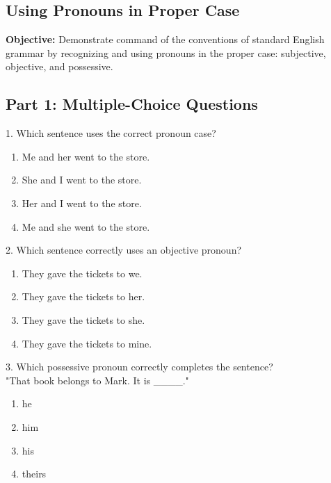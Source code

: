 \documentclass[12pt]{article}
\begin{document}
\subsection*{Using Pronouns in Proper Case}
\onehalfspacing

\begin{tcolorbox}[colframe=black!40, colback=gray!0, title=Learning Objective]
\textbf{Objective:} Demonstrate command of the conventions of standard English grammar by recognizing and using pronouns in the proper case: subjective, objective, and possessive.
\end{tcolorbox}

\subsection*{Part 1: Multiple-Choice Questions}

1. Which sentence uses the correct pronoun case?  
\begin{enumerate}[label=\Alph*.]
    \item Me and her went to the store.  
    \item She and I went to the store.  
    \item Her and I went to the store.  
    \item Me and she went to the store.  
\end{enumerate}

\vspace{1cm}

2. Which sentence correctly uses an objective pronoun?  
\begin{enumerate}[label=\Alph*.]
    \item They gave the tickets to we.  
    \item They gave the tickets to her.  
    \item They gave the tickets to she.  
    \item They gave the tickets to mine.  
\end{enumerate}

\vspace{1cm}

3. Which possessive pronoun correctly completes the sentence?  
\\"That book belongs to Mark. It is \_\_\_\_."  
\begin{enumerate}[label=\Alph*.]
    \item he  
    \item him  
    \item his  
    \item theirs  
\end{enumerate}
\end{document}
